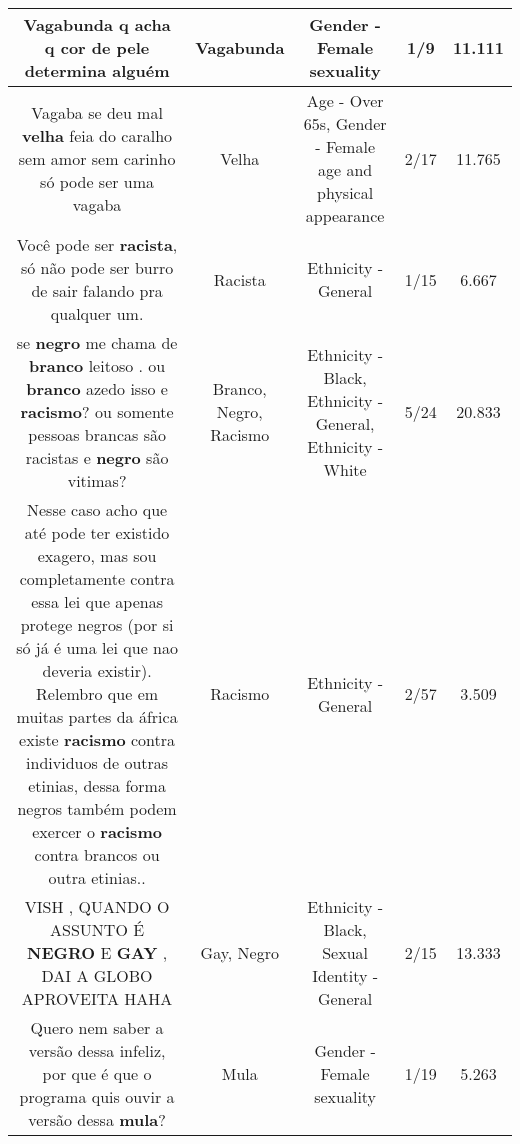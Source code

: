 \documentclass[11pt]{article}
\newlength\mylength
\begin{document}
\begin{center}
\begin{longtable}{|C{.65\mylength}|C{.30\mylength}|C{.12\mylength}|C{.12\mylength}|C{.12\mylength}|}
  \small Vagabunda q acha q cor de pele determina alguém\normalsize   & Vagabunda & Gender - Female sexuality & 1/9 & 11.111 \\  \hline
  \small Vagaba se deu mal \textbf{v\textbf{elha}} feia do caralho sem amor sem carinho só pode ser uma vagaba\normalsize   & Velha & Age - Over 65s, Gender - Female age and physical appearance & 2/17 & 11.765 \\  \hline
  \small Você pode ser \textbf{racista}, só não pode ser burro de sair falando pra qualquer um.\normalsize   & Racista & Ethnicity - General & 1/15 & 6.667 \\  \hline
  \small se \textbf{negro} me chama de \textbf{branco} leitoso . ou \textbf{branco} azedo  isso e \textbf{racismo}? ou somente pessoas brancas são racistas e \textbf{negro} são vitimas?\normalsize   & Branco, Negro, Racismo & Ethnicity - Black, Ethnicity - General, Ethnicity - White & 5/24 & 20.833 \\  \hline
  \small Nesse caso acho que  até pode  ter existido exagero, mas sou completamente contra essa  lei que apenas protege negros (por si só já é uma lei que nao deveria existir). Relembro que em muitas partes da áfrica existe \textbf{racismo} contra individuos de outras etinias, dessa forma negros também podem exercer o \textbf{racismo} contra brancos ou outra etinias..\normalsize   & Racismo & Ethnicity - General & 2/57 & 3.509 \\  \hline
  \small VISH , QUANDO O ASSUNTO É \textbf{NEGRO} E \textbf{GAY} , DAI A GLOBO APROVEITA HAHA\normalsize   & Gay, Negro & Ethnicity - Black, Sexual Identity - General & 2/15 & 13.333 \\  \hline
  \small Quero nem saber a versão dessa infeliz,  por que é que o programa quis ouvir a versão dessa \textbf{mula}?\normalsize   & Mula & Gender - Female sexuality & 1/19 & 5.263 \\  \hline

\end{longtable}
\end{center}
\end{document}
